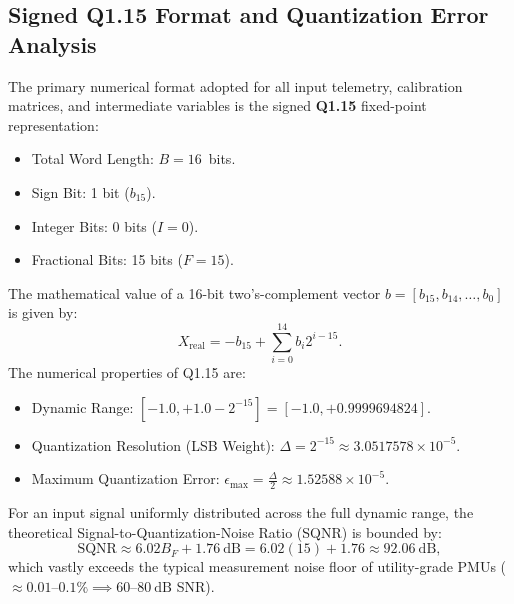 \documentclass[12pt,a4paper]{report}
\begin{document}
\subsection{Signed Q1.15 Format and Quantization Error Analysis}
The primary numerical format adopted for all input telemetry, calibration matrices, and
intermediate variables is the signed \textbf{Q1.15} fixed-point representation:
\begin{itemize}
    \item Total Word Length: $B = 16$~bits.
    \item Sign Bit: 1 bit ($b_{15}$).
    \item Integer Bits: 0 bits ($I = 0$).
    \item Fractional Bits: 15 bits ($F = 15$).
\end{itemize}
The mathematical value of a 16-bit two's-complement vector $b = [b_{15}, b_{14}, \dots, b_0]$
is given by:
\begin{equation}
X_{\text{real}} = -b_{15} + \sum_{i=0}^{14} b_i 2^{i - 15}.
\end{equation}
The numerical properties of Q1.15 are:
\begin{itemize}
    \item Dynamic Range: $[-1.0, +1.0 - 2^{-15}] = [-1.0, +0.9999694824]$.
    \item Quantization Resolution (LSB Weight): $\Delta = 2^{-15} \approx 3.0517578 \times 10^{-5}$.
    \item Maximum Quantization Error: $\epsilon_{\max} = \frac{\Delta}{2} \approx 1.52588 \times 10^{-5}$.
\end{itemize}
For an input signal uniformly distributed across the full dynamic range, the theoretical
Signal-to-Quantization-Noise Ratio (SQNR) is bounded by:
\begin{equation}
\text{SQNR} \approx 6.02 B_F + 1.76~\text{dB} = 6.02(15) + 1.76 \approx 92.06~\text{dB},
\end{equation}
which vastly exceeds the typical measurement noise floor of utility-grade PMUs
($\approx 0.01\text{--}0.1\% \implies 60\text{--}80~\text{dB}$ SNR).
\end{document}
